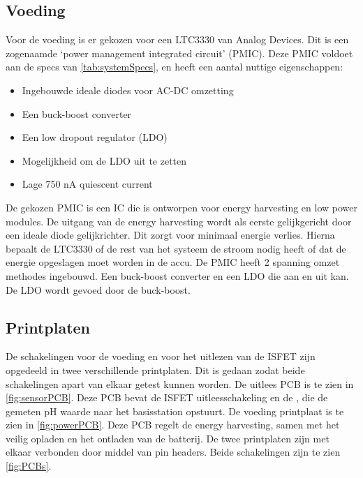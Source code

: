 \subsection{Voeding}
Voor de voeding is er gekozen voor een LTC3330 van Analog Devices. Dit is een zogenaamde `power management integrated circuit' (PMIC). Deze PMIC voldoet aan de specs van \cref{tab:systemSpecs}, en heeft een aantal nuttige eigenschappen:
\begin{itemize}
    \item Ingebouwde ideale diodes voor AC-DC omzetting
    \item Een buck-boost converter
    \item Een low dropout regulator (LDO)
    \item Mogelijkheid om de LDO uit te zetten
    \item Lage 750 nA quiescent current
\end{itemize}

De gekozen PMIC is een IC die is ontworpen voor energy harvesting en low power modules. De uitgang van de energy harvesting wordt als eerste gelijkgericht door een ideale diode gelijkrichter. Dit zorgt voor minimaal energie verlies. Hierna bepaalt de LTC3330 of de rest van het systeem de stroom nodig heeft of dat de energie opgeslagen moet worden in de accu. De PMIC heeft 2 spanning omzet methodes ingebouwd. Een buck-boost converter en een LDO die aan en uit kan. De LDO wordt gevoed door de buck-boost.

\begin{figure}
    \centering

    \label{}
\end{figure}


\subsection{Printplaten}
De schakelingen voor de voeding en voor het uitlezen van de ISFET zijn opgedeeld in twee verschillende printplaten. Dit is gedaan zodat beide schakelingen apart van elkaar getest kunnen worden. De uitlees PCB is te zien in \cref{fig:sensorPCB}. Deze PCB bevat de ISFET uitleesschakeling en de \mcu, die de gemeten pH waarde naar het basisstation opstuurt. De voeding printplaat is te zien in \cref{fig:powerPCB}. Deze PCB regelt de energy harvesting, samen met het veilig opladen en het ontladen van de batterij. De twee printplaten zijn met elkaar verbonden door middel van pin headers. Beide schakelingen zijn te zien \cref{fig:PCBs}.

